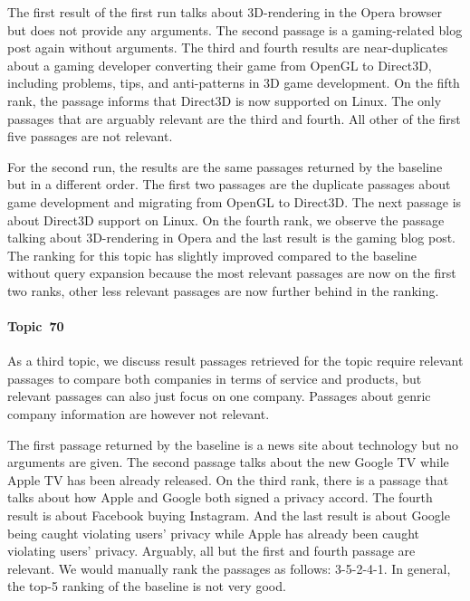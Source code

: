 The first result of the first run talks about 3D-rendering in the Opera browser but does not provide any arguments.
The second passage is a gaming-related blog post again without arguments.
The third and fourth results are near-duplicates about a gaming developer converting their game from OpenGL to Direct3D, including problems, tips, and anti-patterns in 3D game development.
On the fifth rank, the passage informs that Direct3D is now supported on Linux.
The only passages that are arguably relevant are the third and fourth.
All other of the first five passages are not relevant.

For the second run, the results are the same passages returned by the baseline but in a different order.
The first two passages are the duplicate passages about game development and migrating from OpenGL to Direct3D.
The next passage is about Direct3D support on Linux.
On the fourth rank, we observe the passage talking about 3D-rendering in Opera and the last result is the gaming blog post.
The ranking for this topic has slightly improved compared to the baseline without query expansion because the most relevant passages are now on the first two ranks, other less relevant passages are now further behind in the ranking.

\paragraph{Topic~70}

As a third topic, we discuss result passages retrieved for the topic
\citet{BondarenkoFKSGBPBSWPH2022} require relevant passages to compare both companies in terms of service and products, but relevant passages can also just focus on one company.
Passages about genric company information are however not relevant.

The first passage returned by the baseline is a news site about technology but no arguments are given.
The second passage talks about the new Google TV while Apple TV has been already released.
On the third rank, there is a passage that talks about how Apple and Google both signed a privacy accord.
The fourth result is about Facebook buying Instagram.
And the last result is about Google being caught violating users' privacy while Apple has already been caught violating users' privacy.
Arguably, all but the first and fourth passage are relevant.
We would manually rank the passages as follows: 3-5-2-4-1.
In general, the top-5 ranking of the baseline is not very good.

